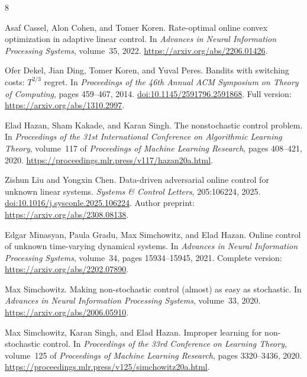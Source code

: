 \documentclass[11pt]{article}
\theoremstyle{remark}
\begin{document}
\begin{thebibliography}{8}

Asaf Cassel, Alon Cohen, and Tomer Koren.
\newblock Rate-optimal online convex optimization in adaptive linear control.
\newblock In \emph{Advances in Neural Information Processing Systems}, volume~35, 2022.
\newblock \url{https://arxiv.org/abs/2206.01426}.

Ofer Dekel, Jian Ding, Tomer Koren, and Yuval Peres.
\newblock Bandits with switching costs: $T^{2/3}$ regret.
\newblock In \emph{Proceedings of the 46th Annual ACM Symposium on Theory
of Computing}, pages 459--467, 2014.
\newblock \href{https://doi.org/10.1145/2591796.2591868}{doi:10.1145/2591796.2591868}.
\newblock Full version: \url{https://arxiv.org/abs/1310.2997}.

Elad Hazan, Sham Kakade, and Karan Singh.
\newblock The nonstochastic control problem.
\newblock In \emph{Proceedings of the 31st International Conference on
Algorithmic Learning Theory}, volume~117 of \emph{Proceedings of Machine
Learning Research}, pages 408--421, 2020.
\newblock \url{https://proceedings.mlr.press/v117/hazan20a.html}.

Zishun Liu and Yongxin Chen.
\newblock Data-driven adversarial online control for unknown linear systems.
\newblock \emph{Systems \& Control Letters}, 205:106224, 2025.
\newblock \href{https://doi.org/10.1016/j.sysconle.2025.106224}{doi:10.1016/j.sysconle.2025.106224}.
\newblock Author preprint: \url{https://arxiv.org/abs/2308.08138}.

Edgar Minasyan, Paula Gradu, Max Simchowitz, and Elad Hazan.
\newblock Online control of unknown time-varying dynamical systems.
\newblock In \emph{Advances in Neural Information Processing Systems},
volume~34, pages 15934--15945, 2021.
\newblock Complete version: \url{https://arxiv.org/abs/2202.07890}.

Max Simchowitz.
\newblock Making non-stochastic control (almost) as easy as stochastic.
\newblock In \emph{Advances in Neural Information Processing Systems}, volume~33, 2020.
\newblock \url{https://arxiv.org/abs/2006.05910}.

Max Simchowitz, Karan Singh, and Elad Hazan.
\newblock Improper learning for non-stochastic control.
\newblock In \emph{Proceedings of the 33rd Conference on Learning Theory},
volume~125 of \emph{Proceedings of Machine Learning Research},
pages 3320--3436, 2020.
\newblock \url{https://proceedings.mlr.press/v125/simchowitz20a.html}.

\end{thebibliography}
\end{document}
